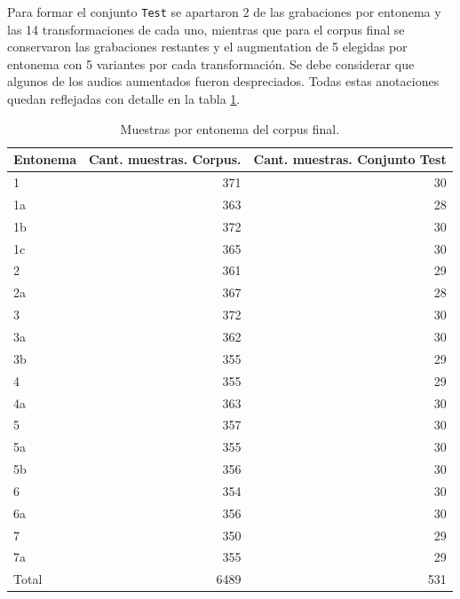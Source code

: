 Para formar el conjunto \texttt{Test} se apartaron 2 de las grabaciones por entonema y las 14 transformaciones de cada uno, mientras que para el corpus final se conservaron las grabaciones restantes y el augmentation de 5 elegidas por entonema con 5 variantes por cada transformaci\'on. Se debe considerar que algunos de los audios aumentados fueron despreciados. Todas estas anotaciones quedan reflejadas con detalle en la tabla \ref{Ta:ct}.


\begin{table}
\begin{center}
\begin{tabular}{l|r|r} \hline
\bf Entonema & \bf Cant. muestras. Corpus. & \bf Cant. muestras. Conjunto Test \\ \hline
 1 & 371 & 30 \\ 
 1a & 363 & 28 \\ 
 1b & 372 & 30 \\ 
 1c & 365 & 30 \\ 
 2 & 361 & 29 \\ 
 2a & 367 & 28 \\ 
 3 & 372 & 30  \\ 
 3a & 362 & 30 \\ 
 3b & 355 & 29 \\
 4 & 355 & 29 \\
 4a & 363 & 30 \\
 5 & 357 & 30 \\
 5a & 355 & 30 \\
 5b & 356 & 30 \\
 6 & 354 & 30 \\
 6a & 356 & 30 \\
 7 & 350 & 29 \\
 7a & 355 & 29 \\ \hline
 Total & 6489 & 531 \\ \hline
\end{tabular}
\caption{Muestras por entonema del corpus final.}\label{Ta:ct}
\end{center}
\end{table}


